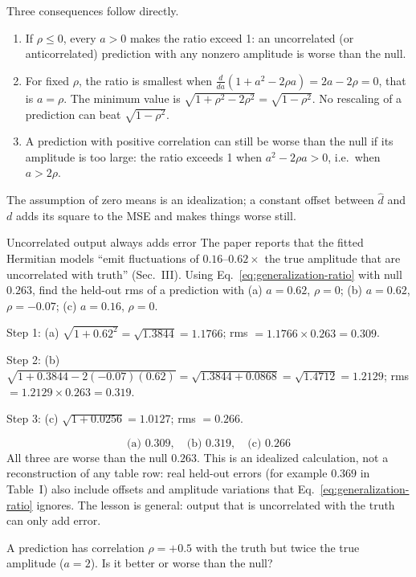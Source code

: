 Three consequences follow directly.
\begin{enumerate}
\item If $\rho\le0$, every $a>0$ makes the ratio exceed 1: an uncorrelated (or anticorrelated) prediction with any nonzero amplitude is worse than the null.
\item For fixed $\rho$, the ratio is smallest when $\frac{d}{da}(1+a^2-2\rho a)=2a-2\rho=0$, that is $a=\rho$. The minimum value is $\sqrt{1+\rho^2-2\rho^2}=\sqrt{1-\rho^2}$. No rescaling of a prediction can beat $\sqrt{1-\rho^2}$.
\item A prediction with positive correlation can still be worse than the null if its amplitude is too large: the ratio exceeds 1 when $a^2-2\rho a>0$, i.e.\ when $a>2\rho$.
\end{enumerate}
The assumption of zero means is an idealization; a constant offset between $\hat d$ and $d$ adds its square to the MSE and makes things worse still.

\begin{sample}{Uncorrelated output always adds error}
The paper reports that the fitted Hermitian models ``emit fluctuations of $0.16$--$0.62\times$ the true amplitude that are uncorrelated with truth'' (Sec.~III). Using Eq.~\eqref{eq:generalization-ratio} with null $0.263$, find the held-out rms of a prediction with (a) $a=0.62$, $\rho=0$; (b) $a=0.62$, $\rho=-0.07$; (c) $a=0.16$, $\rho=0$.

Step 1: (a) $\sqrt{1+0.62^2}=\sqrt{1.3844}=1.1766$; rms $=1.1766\times0.263=0.309$.

Step 2: (b) $\sqrt{1+0.3844-2(-0.07)(0.62)}=\sqrt{1.3844+0.0868}=\sqrt{1.4712}=1.2129$; rms $=1.2129\times0.263=0.319$.

Step 3: (c) $\sqrt{1+0.0256}=1.0127$; rms $=0.266$.

\[
\boxed{\text{(a) }0.309,\quad\text{(b) }0.319,\quad\text{(c) }0.266}
\]
All three are worse than the null $0.263$. This is an idealized calculation, not a reconstruction of any table row: real held-out errors (for example $0.369$ in Table~I) also include offsets and amplitude variations that Eq.~\eqref{eq:generalization-ratio} ignores. The lesson is general: output that is uncorrelated with the truth can only add error.
\end{sample}

\begin{checkpoint}
A prediction has correlation $\rho=+0.5$ with the truth but twice the true amplitude ($a=2$). Is it better or worse than the null?
\end{checkpoint}

